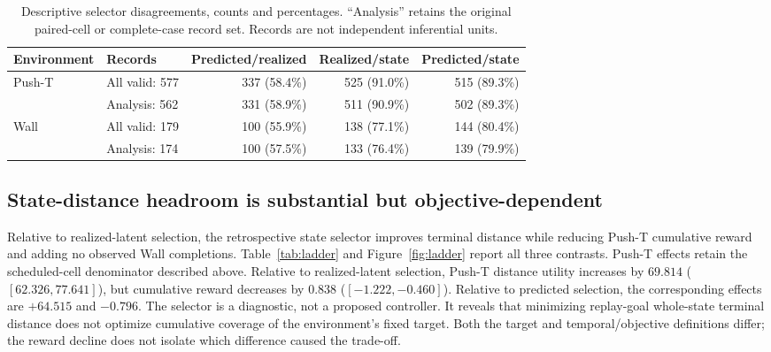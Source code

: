 \documentclass{article}
\begin{document}
\begin{table}[t]
\caption{Descriptive selector disagreements, counts and percentages.
``Analysis'' retains the original paired-cell or complete-case record set.
Records are not independent inferential units.}
\label{tab:disagreement}
\centering\small
\begin{tabular}{llrrr}
\toprule
Environment & Records & Predicted/realized & Realized/state & Predicted/state\\
\midrule
Push-T & All valid: 577 & 337 (58.4\%) & 525 (91.0\%) & 515 (89.3\%)\\
 & Analysis: 562 & 331 (58.9\%) & 511 (90.9\%) & 502 (89.3\%)\\
Wall & All valid: 179 & 100 (55.9\%) & 138 (77.1\%) & 144 (80.4\%)\\
 & Analysis: 174 & 100 (57.5\%) & 133 (76.4\%) & 139 (79.9\%)\\
\bottomrule
\end{tabular}
\end{table}

\subsection{State-distance headroom is substantial but objective-dependent}

Relative to realized-latent selection, the retrospective state selector improves
terminal distance while reducing Push-T cumulative reward and adding no observed
Wall completions.
Table~\ref{tab:ladder} and Figure~\ref{fig:ladder} report all three contrasts.
Push-T effects retain the scheduled-cell denominator described above.
Relative to realized-latent selection, Push-T distance utility increases by
$69.814$ ($[62.326,77.641]$), but cumulative reward decreases by $0.838$
($[-1.222,-0.460]$). Relative to predicted selection, the corresponding
effects are $+64.515$ and $-0.796$. The selector is a diagnostic, not a
proposed controller. It reveals that minimizing replay-goal whole-state
terminal distance does not optimize cumulative coverage of the environment's
fixed target. Both the target and temporal/objective definitions differ; the
reward decline does not isolate which difference caused the trade-off.
\end{document}
